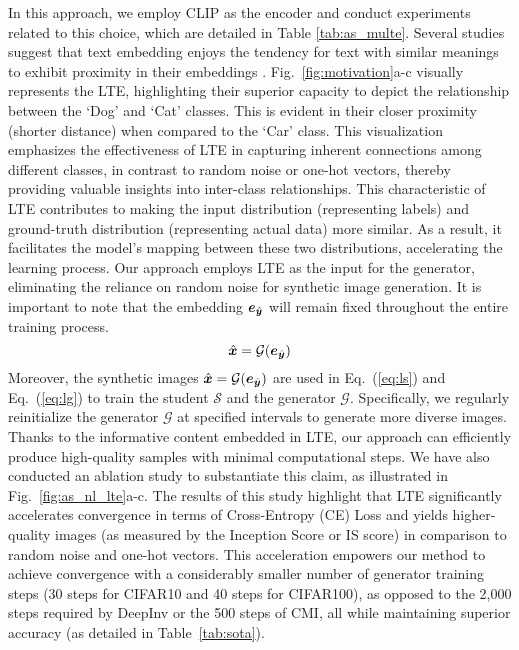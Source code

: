 \documentclass{article} %
\begin{document}
In this approach, we employ CLIP \citep{clip} as the encoder and conduct experiments related to this choice, which are detailed in Table \ref{tab:as_multe}. Several studies suggest that text embedding enjoys the tendency for text with similar meanings to exhibit proximity in their embeddings \citep{doc2vec}. Fig.~\ref{fig:motivation}a-c visually represents the LTE, highlighting their superior capacity to depict the relationship between the `Dog' and `Cat' classes. This is evident in their closer proximity (shorter distance) when compared to the `Car' class. This visualization emphasizes the effectiveness of LTE in capturing inherent connections among different classes, in contrast to random noise or one-hot vectors, thereby providing valuable insights into inter-class relationships. This characteristic of LTE contributes to making the input distribution (representing labels)  and ground-truth distribution  (representing actual data) more similar. As a result, it facilitates the model's mapping between these two distributions, accelerating the learning process. Our approach employs LTE as the input for the generator, eliminating the reliance on random noise for synthetic image generation. It is important to note that the embedding ${\bm{e}}_{\hat{{\bm{y}}}}$ will remain fixed throughout the entire training process. 
\begin{equation}
    \hat{{\bm{x}}} = \mathcal{G}({\bm{e}}_{\hat{{\bm{y}}}})
    \label{eq:genxnew}
\end{equation}
Moreover, the synthetic images $\hat{{\bm{x}}} = \mathcal{G}({\bm{e}}_{\hat{{\bm{y}}}})$ are used in Eq.~(\ref{eq:ls}) and Eq.~(\ref{eq:lg}) to train the student $\mathcal{S}$ and the generator $\mathcal{G}$. Specifically, we regularly reinitialize the generator $\mathcal{G}$ at specified intervals to generate more diverse images. Thanks to the informative content embedded in LTE, our approach can efficiently produce high-quality samples with minimal computational steps. We have also conducted an ablation study to substantiate this claim, as illustrated in Fig.~\ref{fig:as_nl_lte}a-c. The results of this study highlight that LTE significantly accelerates convergence in terms of Cross-Entropy (CE) Loss and yields higher-quality images (as measured by the Inception Score or IS score) in comparison to random noise and one-hot vectors. This acceleration empowers our method to achieve convergence with a considerably smaller number of generator training steps (30 steps for CIFAR10 and 40 steps for CIFAR100), as opposed to the 2,000 steps required by DeepInv or the 500 steps of CMI, all while maintaining superior accuracy (as detailed in Table~\ref{tab:sota}).
\end{document}
